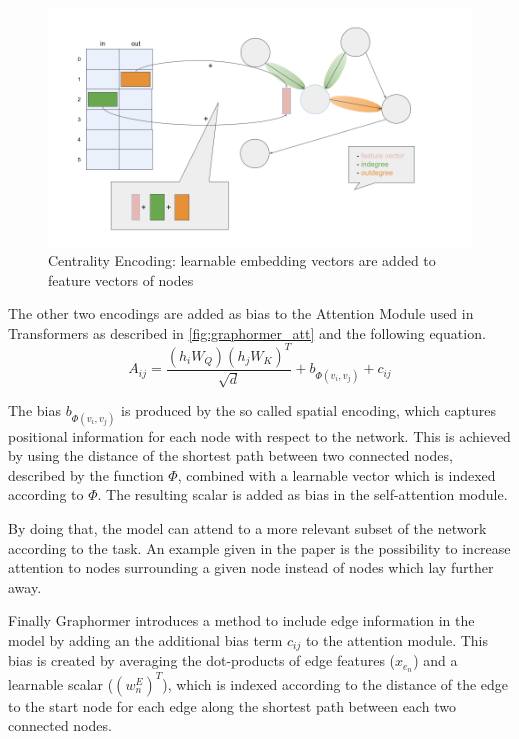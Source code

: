 \begin{figure}[ht!]
    \centering
    \includegraphics[scale=0.35]{tex/res/graphormer_centr_enc.png}
    \caption{Centrality Encoding: learnable embedding vectors are added to feature vectors of nodes}
    \label{fig:graphormer_centr_enc}
\end{figure}

The other two encodings are added as bias to the Attention Module used in Transformers as described in \autoref{fig:graphormer_att} and the following equation.
\begin{equation}
    A_{ij} = \frac{(h_i W_Q)(h_j W_K)^T}{\sqrt{d}} + b_{\Phi (v_i, v_j)} + c_{ij}
    \label{eqn:attention-matrix}
\end{equation}

The bias $b_{\Phi (v_i, v_j)}$ is produced by the so called spatial encoding, which captures positional information for each node with respect to the network. This is achieved by using the distance of the shortest path between two connected nodes, described by the function $\Phi$, combined with a learnable vector which is indexed according to $\Phi$. The resulting scalar is added as bias in the self-attention module.

By doing that, the model can attend to a more relevant subset of the network according to the task. An example given in the paper is the possibility to increase attention to nodes surrounding a given node instead of nodes which lay further away.

Finally Graphormer introduces a method to include edge information in the model by adding an the additional bias term $c_{ij}$ to the attention module. This bias is created by averaging the dot-products of edge features ($x_{e_n}$) and a learnable scalar ($(w_n^E)^T$), which is indexed according to the distance of the edge to the start node for each edge along the shortest path between each two connected nodes.

